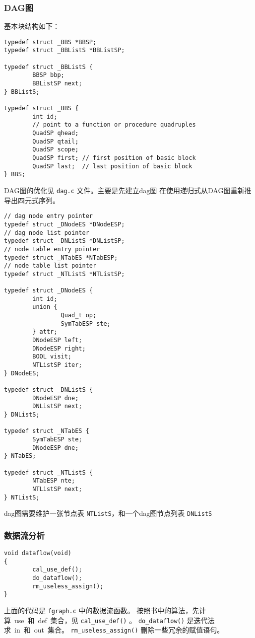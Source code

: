 \subsubsection{DAG图}
基本块结构如下：
\begin{verbatim}
typedef struct _BBS *BBSP;
typedef struct _BBListS *BBListSP;

typedef struct _BBListS {
        BBSP bbp;
        BBListSP next;
} BBListS;

typedef struct _BBS {
        int id;
        // point to a function or procedure quadruples
        QuadSP qhead;
        QuadSP qtail;
        QuadSP scope; 
        QuadSP first; // first position of basic block
        QuadSP last;  // last position of basic block
} BBS;
\end{verbatim}
DAG图的优化见 \verb|dag.c| 文件。主要是先建立dag图
在使用递归式从DAG图重新推导出四元式序列。
\begin{verbatim}
// dag node entry pointer
typedef struct _DNodeES *DNodeESP;
// dag node list pointer
typedef struct _DNListS *DNListSP;
// node table entry pointer
typedef struct _NTabES *NTabESP;
// node table list pointer
typedef struct _NTListS *NTListSP;

typedef struct _DNodeES {
        int id;
        union {
                Quad_t op;
                SymTabESP ste;
        } attr;
        DNodeESP left;
        DNodeESP right;
        BOOL visit;
        NTListSP iter;
} DNodeES;

typedef struct _DNListS {
        DNodeESP dne;
        DNListSP next;
} DNListS;

typedef struct _NTabES {
        SymTabESP ste;
        DNodeESP dne;
} NTabES;

typedef struct _NTListS {
        NTabESP nte;
        NTListSP next;
} NTListS;

\end{verbatim}
dag图需要维护一张节点表 \verb|NTListS|，和一个dag图节点列表
\verb|DNListS|
\subsubsection{数据流分析}
\begin{verbatim}
void dataflow(void)
{
        cal_use_def();
        do_dataflow();
        rm_useless_assign();
}
\end{verbatim}
上面的代码是 \verb|fgraph.c| 中的数据流函数。
按照书中的算法，先计算~use~和~def~集合，见 \verb|cal_use_def()| 。
\verb|do_dataflow()| 是迭代法求~in~和~out~集合。
\verb|rm_useless_assign()| 删除一些冗余的赋值语句。
